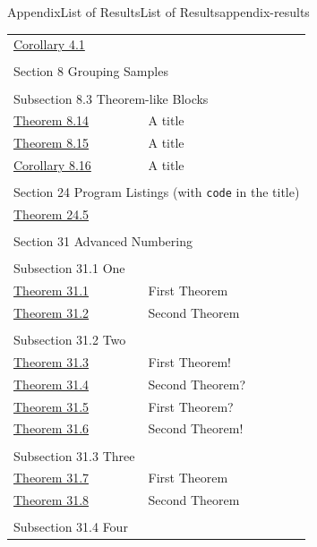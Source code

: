 \documentclass[twoside,10pt,]{article}
\newcommand{\mono}[1]{\texttt{#1}}
\numberwithin{equation}{section}
\begin{document}
\begin{appendixptx}{Appendix}{List of Results}{}{List of Results}{}{}{appendix-results}
\begin{longtable}[l]{ll}
\hyperref[corollary-FTC-derivative]{Corollary 4.1}& \\
\multicolumn{2}{l}{\null}\\[1.5ex] \multicolumn{2}{l}{\large Section 8 Grouping Samples}\\[0.5ex]
\multicolumn{2}{l}{\null}\\[1.5ex] \multicolumn{2}{l}{\large Subsection 8.3 Theorem-like Blocks}\\[0.5ex]
\hyperref[block-samples-theorem-like-2]{Theorem 8.14}& A title\\
\hyperref[block-samples-theorem-like-3]{Theorem 8.15}& A title\\
\hyperref[block-samples-theorem-like-4]{Corollary 8.16}& A title\\
\multicolumn{2}{l}{\null}\\[1.5ex] \multicolumn{2}{l}{\large Section 24 Program Listings (with \mono{code} in the title)}\\[0.5ex]
\hyperref[theorem-detached]{Theorem 24.5}& \\
\multicolumn{2}{l}{\null}\\[1.5ex] \multicolumn{2}{l}{\large Section 31 Advanced Numbering}\\[0.5ex]
\multicolumn{2}{l}{\null}\\[1.5ex] \multicolumn{2}{l}{\large Subsection 31.1 One}\\[0.5ex]
\hyperref[theorem-number-01]{Theorem 31.1}& First Theorem\\
\hyperref[theorem-number-02]{Theorem 31.2}& Second Theorem\\
\multicolumn{2}{l}{\null}\\[1.5ex] \multicolumn{2}{l}{\large Subsection 31.2 Two}\\[0.5ex]
\hyperref[theorem-number-03]{Theorem 31.3}& First Theorem!\\
\hyperref[theorem-number-04]{Theorem 31.4}& Second Theorem?\\
\hyperref[theorem-number-05]{Theorem 31.5}& First Theorem?\\
\hyperref[theorem-number-06]{Theorem 31.6}& Second Theorem!\\
\multicolumn{2}{l}{\null}\\[1.5ex] \multicolumn{2}{l}{\large Subsection 31.3 Three}\\[0.5ex]
\hyperref[theorem-number-07]{Theorem 31.7}& First Theorem\\
\hyperref[theorem-number-08]{Theorem 31.8}& Second Theorem\\
\multicolumn{2}{l}{\null}\\[1.5ex] \multicolumn{2}{l}{\large Subsection 31.4 Four}\\[0.5ex]

\end{longtable}
\end{appendixptx}
\end{document}
